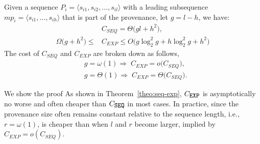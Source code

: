 


\begin{theorem}
\label{theo:seq-exp}
    Given a sequence $P_i = \langle s_{i1}, s_{i2}, \ldots, s_{il} \rangle$ with a leading subsequence $mp_i = \langle s_{i1}, \ldots, s_{ih} \rangle$ that is part of the provenance, let $g = l-h$, we have: 
    \begin{align*}
    &C_{SEQ}=\Theta\!\bigl(gl+h^{2}\bigr),  \\ 
    \Omega\!\bigl(g+h^{2}\bigr)\le
&C_{EXP}\le
O\!\bigl(g\log^2_2 g+h\log^2_2g+h^{2}\bigr)
    \end{align*}
    The cost of $C_{SEQ}$ and $C_{EXP}$ are broken down as follows,  
    \begin{align*}
& g=\omega(1)
       \Longrightarrow\;
         C_{EXP}=o\bigl(C_{SEQ}\bigr), \\%
& g=\Theta(1)
       \Longrightarrow\;
         C_{EXP}=\Theta \bigl(C_{SEQ}\bigr).
\end{align*}
\end{theorem}
We show the proof  As shown in Theorem~\ref{theo:seq-exp}, \( C_{\texttt{\small EXP}} \) is asymptotically no worse and often cheaper than \( C_{\texttt{\small SEQ}} \) in most cases. 
 In practice, since the provenance size often remains constant relative to the sequence length, i.e., \( r = \omega(1) \),  is cheaper than  when $l$ and $r$ become larger, implied by \( C_{EXP} = o(C_{SEQ}) \).  

